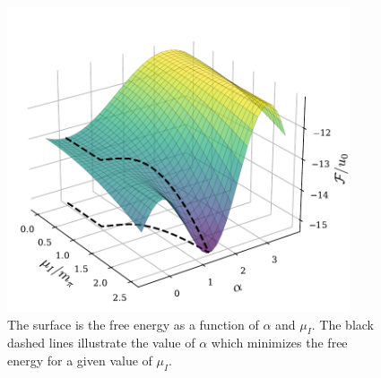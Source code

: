 \begin{figure}[htb]
    \centering
    \includegraphics[width=0.9\textwidth]{../scripts/figurer/free_energy_surface.pdf}
    \caption{
        The surface is the free energy as a function of $\alpha$ and $\mu_I$.
        The black dashed lines illustrate the value of $\alpha$ which minimizes the free energy for a given value of $\mu_I$.
    }
    \label{fig: free energy surface}
\end{figure}


